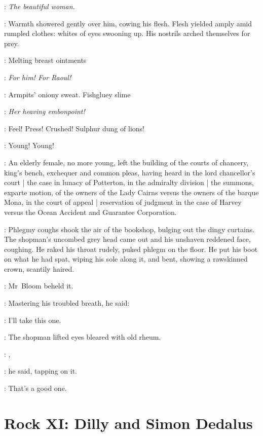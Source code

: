 \book:
\emph{The beautiful woman.}

:
Warmth showered gently over him,
cowing his flesh.
Flesh yielded amply amid rumpled clothes:%
whites of eyes swooning up.
His nostrils arched themselves for prey.

\BloomInt:
Melting breast ointments

\book:
\emph{For him!
For Raoul!}

\BloomInt:
Armpits' oniony sweat.
Fishgluey slime

\book:
\emph{Her heaving embonpoint!}

\BloomInt:
Feel!
Press!
Crushed!
Sulphur dung of lions!

\BloomInt:
Young!
Young!

\begin{interject}
    :
    An elderly female,
    no more young,
    left the building of the courts of chancery,
    king's bench,
    exchequer
    and common pleas,
    having heard in the lord chancellor's court |
    the case in lunacy of Potterton,
    in the admiralty division |
    the summons,
    exparte motion,
    of the owners of the Lady Cairns
    versus the owners of the barque Mona,
    in the court of appeal |
    reservation of judgment
    in the case of Harvey versus
    the Ocean Accident and Guarantee Corporation.
\end{interject}%

:
Phlegmy coughs shook the air of the bookshop,
bulging out the dingy curtains.
The shopman's uncombed grey head came out
and his unshaven reddened face,
coughing.
He raked his throat rudely,
puked phlegm on the floor.
He put his boot on what he had spat,
wiping his sole along it,
and bent,
showing a rawskinned crown,
scantily haired.

:
Mr~Bloom beheld it.

:
Mastering his troubled breath,
he said:

\Bloom:
I'll take this one.

:
The shopman lifted eyes%
bleared with old rheum.

\shopman:
,

:
he said,
tapping on it.

\shopman:
That's a good one.


\section*{Rock XI: Dilly and Simon Dedalus}


